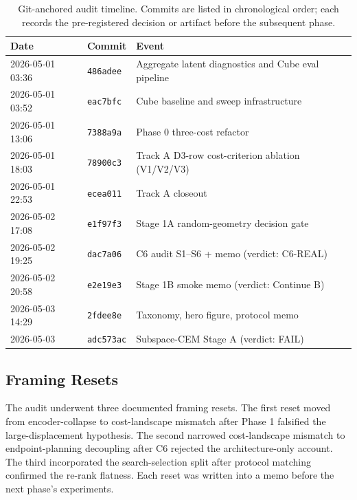 \begin{table}[h]
\centering
\footnotesize
\setlength{\tabcolsep}{4pt}
\begin{tabular}{@{}p{} p{} p{}@{}}
\toprule
Date & Commit & Event \\
\midrule
2026-05-01 03:36 & \texttt{486adee} & Aggregate latent diagnostics and Cube eval pipeline \\
2026-05-01 03:52 & \texttt{eac7bfc} & Cube baseline and sweep infrastructure \\
2026-05-01 13:06 & \texttt{7388a9a} & Phase 0 three-cost refactor \\
2026-05-01 18:03 & \texttt{78900c3} & Track A D3-row cost-criterion ablation (V1/V2/V3) \\
2026-05-01 22:53 & \texttt{ecea011} & Track A closeout \\
2026-05-02 17:08 & \texttt{e1f97f3} & Stage 1A random-geometry decision gate \\
2026-05-02 19:25 & \texttt{dac7a06} & C6 audit S1--S6 + memo (verdict: C6-REAL) \\
2026-05-02 20:58 & \texttt{e2e19e3} & Stage 1B smoke memo (verdict: Continue B) \\
2026-05-03 14:29 & \texttt{2fdee8e} & Taxonomy, hero figure, protocol memo \\
2026-05-03 & \texttt{adc573ac} & Subspace-CEM Stage A (verdict: FAIL) \\
\bottomrule
\end{tabular}
\caption{Git-anchored audit timeline.  Commits are listed in chronological
order; each records the pre-registered decision or artifact before the
subsequent phase.}
\label{tab:git-anchored-timeline}
\end{table}

\subsection{Framing Resets}

The audit underwent three documented framing resets.  The
first reset moved from encoder-collapse to cost-landscape mismatch after
Phase 1 falsified the large-displacement hypothesis.  The second narrowed
cost-landscape mismatch to endpoint-planning decoupling after C6 rejected
the architecture-only account.  The third incorporated the search-selection
split after protocol matching confirmed the re-rank flatness.  Each reset
was written into a memo before the next phase's experiments.
